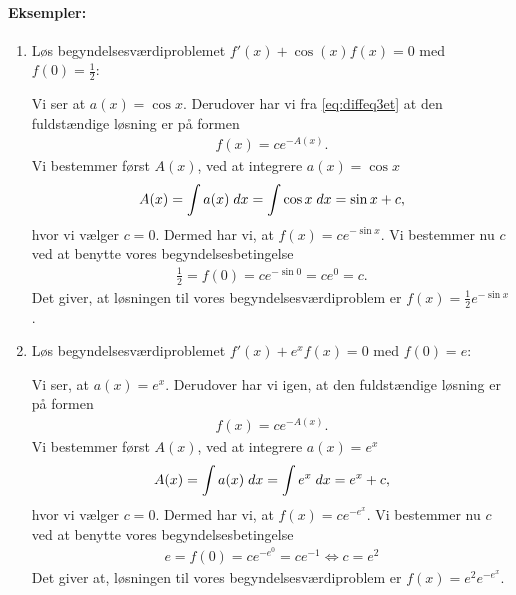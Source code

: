 \paragraph*{Eksempler:}
\begin{enumerate}
\item Løs begyndelsesværdiproblemet $f'(x) + \cos (x)f(x) = 0$ med $f(0)=\frac{1}{2}$:

Vi ser at $a(x)=\cos x$. Derudover har vi fra \eqref{eq:diffeq3et} at den fuldstændige løsning er på formen
\begin{align*}
f(x)=ce^{-A(x)}.
\end{align*}
Vi bestemmer først $A(x)$, ved at integrere $a(x)=\cos x$
\begin{align*}
A(x) = \int a(x) \; d x = \int \cos x \; d x = \sin x +c,
\end{align*}
hvor vi vælger $c=0$. Dermed har vi, at $f(x)=ce^{-\sin x }$. Vi bestemmer nu $c$ ved at benytte vores begyndelsesbetingelse
\begin{align*}
\frac{1}{2} = f(0)= ce^{-\sin 0} = ce^0 =c. 
\end{align*}
Det giver, at løsningen til vores begyndelsesværdiproblem er $f(x) = \frac{1}{2}e^{-\sin x}$.
\item Løs begyndelsesværdiproblemet $f'(x) +  e^x f(x) = 0$ med $f(0)=e$:

Vi ser, at $a(x)=e^x$. Derudover har vi igen, at den fuldstændige løsning er på formen
\begin{align*}
f(x)=ce^{-A(x)}.
\end{align*}
Vi bestemmer først $A(x)$, ved at integrere $a(x)=e^x$
\begin{align*}
A(x) = \int a(x) \; d x = \int e^x \; d x = e^x + c,
\end{align*}
hvor vi vælger $c=0$. Dermed har vi, at $f(x)=ce^{-e^x }$. Vi bestemmer nu $c$ ved at benytte vores begyndelsesbetingelse
\begin{align*}
e = f(0)= ce^{-e^0} = ce^{-1}  \Leftrightarrow c=e^2
\end{align*}
Det giver at, løsningen til vores begyndelsesværdiproblem er $f(x) = e^2e^{-e^x}$.
\end{enumerate}






